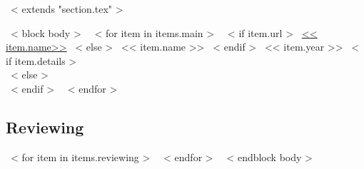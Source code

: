 ~< extends "section.tex" >~

~< block body >~
~< for item in items.main >~
  ~< if item.url >~
    \href{<< item.url >>}{<< item.name>>}
  ~< else >~
    << item.name >>
  ~< endif >~
  \hfill << item.year >>
  ~< if item.details >~
    \\ {\scriptsize \color{gray}{<< item.details >>}}
  ~< else >~
    \\[4.5mm]
  ~< endif >~
~< endfor >~

\subsection{Reviewing}
~< for item in items.reviewing >~
~< endfor >~
~< endblock body >~